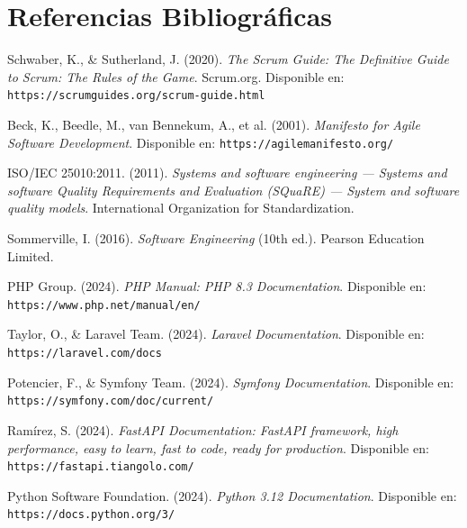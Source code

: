 \documentclass[conference]{IEEEtran}
\begin{document}
\section{Referencias Bibliográficas}

\begin{thebibliography}{20}

Schwaber, K., \& Sutherland, J. (2020). \textit{The Scrum Guide: The Definitive Guide to Scrum: The Rules of the Game}. Scrum.org. Disponible en: \texttt{https://scrumguides.org/scrum-guide.html}

Beck, K., Beedle, M., van Bennekum, A., et al. (2001). \textit{Manifesto for Agile Software Development}. Disponible en: \texttt{https://agilemanifesto.org/}

ISO/IEC 25010:2011. (2011). \textit{Systems and software engineering — Systems and software Quality Requirements and Evaluation (SQuaRE) — System and software quality models}. International Organization for Standardization.

Sommerville, I. (2016). \textit{Software Engineering} (10th ed.). Pearson Education Limited.

PHP Group. (2024). \textit{PHP Manual: PHP 8.3 Documentation}. Disponible en: \texttt{https://www.php.net/manual/en/}

Taylor, O., \& Laravel Team. (2024). \textit{Laravel Documentation}. Disponible en: \texttt{https://laravel.com/docs}

Potencier, F., \& Symfony Team. (2024). \textit{Symfony Documentation}. Disponible en: \texttt{https://symfony.com/doc/current/}

Ramírez, S. (2024). \textit{FastAPI Documentation: FastAPI framework, high performance, easy to learn, fast to code, ready for production}. Disponible en: \texttt{https://fastapi.tiangolo.com/}

Python Software Foundation. (2024). \textit{Python 3.12 Documentation}. Disponible en: \texttt{https://docs.python.org/3/}


\end{thebibliography}
\end{document}
